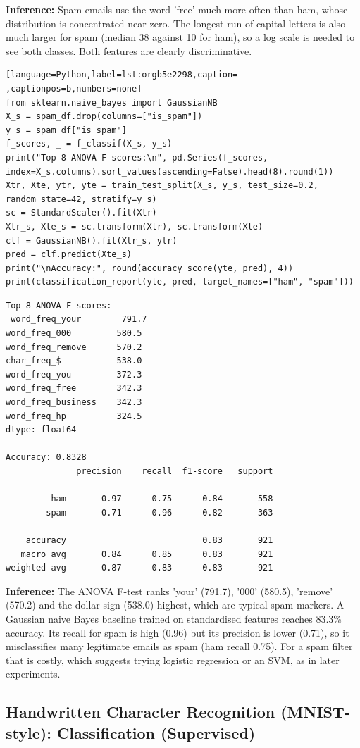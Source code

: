 \documentclass[11pt]{article}
\begin{document}
\textbf{Inference:} Spam emails use the word 'free' much more often than ham, whose distribution is concentrated
near zero. The longest run of capital letters is also much larger for spam (median 38
against 10 for ham), so a log scale is needed to see both classes. Both features are clearly
discriminative.
\begin{lstlisting}[language=Python,label=lst:orgb5e2298,caption= ,captionpos=b,numbers=none]
from sklearn.naive_bayes import GaussianNB
X_s = spam_df.drop(columns=["is_spam"])
y_s = spam_df["is_spam"]
f_scores, _ = f_classif(X_s, y_s)
print("Top 8 ANOVA F-scores:\n", pd.Series(f_scores, index=X_s.columns).sort_values(ascending=False).head(8).round(1))
Xtr, Xte, ytr, yte = train_test_split(X_s, y_s, test_size=0.2, random_state=42, stratify=y_s)
sc = StandardScaler().fit(Xtr)
Xtr_s, Xte_s = sc.transform(Xtr), sc.transform(Xte)
clf = GaussianNB().fit(Xtr_s, ytr)
pred = clf.predict(Xte_s)
print("\nAccuracy:", round(accuracy_score(yte, pred), 4))
print(classification_report(yte, pred, target_names=["ham", "spam"]))
\end{lstlisting}

\begin{verbatim}
Top 8 ANOVA F-scores:
 word_freq_your        791.7
word_freq_000         580.5
word_freq_remove      570.2
char_freq_$           538.0
word_freq_you         372.3
word_freq_free        342.3
word_freq_business    342.3
word_freq_hp          324.5
dtype: float64

Accuracy: 0.8328
              precision    recall  f1-score   support

         ham       0.97      0.75      0.84       558
        spam       0.71      0.96      0.82       363

    accuracy                           0.83       921
   macro avg       0.84      0.85      0.83       921
weighted avg       0.87      0.83      0.83       921
\end{verbatim}

\textbf{Inference:} The ANOVA F-test ranks 'your' (791.7), '000' (580.5), 'remove' (570.2) and the dollar sign
(538.0) highest, which are typical spam markers. A Gaussian naive Bayes baseline trained on
standardised features reaches 83.3\% accuracy. Its recall for spam is high (0.96) but its
precision is lower (0.71), so it misclassifies many legitimate emails as spam (ham recall
0.75). For a spam filter that is costly, which suggests trying logistic regression or an
SVM, as in later experiments.

\subsection*{Handwritten Character Recognition (MNIST-style): Classification (Supervised)}
\label{sec:org0aef4f1}
\end{document}
